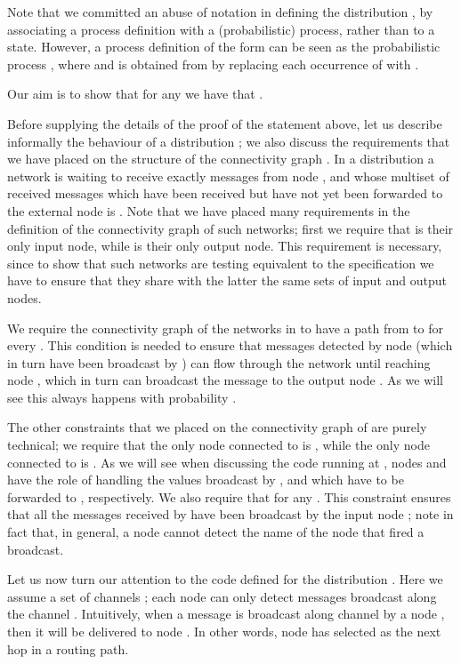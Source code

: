 \documentclass{LMCS}
\begin{document}
\begin{remark}
Note that we committed an abuse of notation in defining the 
distribution , by associating a 
process definition with a (probabilistic) process, rather than to 
a state. However, a process definition of the form  can be seen as the probabilistic 
process , where 
 and  is obtained from  by replacing 
each occurrence of  with .
\end{remark}
\noindent
Our aim is to show that for any  
we have that . 

Before supplying the details of the proof of the statement above, 
let us describe informally the behaviour of a distribution 
; we also discuss the 
requirements that we have placed on the structure of the 
connectivity graph . 
In a distribution  
a network is waiting to receive exactly  messages from node , 
and whose multiset of received messages which have been 
received but have not yet been forwarded to the external node  
is .
Note that we have placed many requirements in the definition of 
the connectivity graph of such networks; first we require that 
 is their only input node, while  is their only output node. 
This requirement is necessary, since to show that such 
networks are testing equivalent to the specification we 
have to ensure that they share with the latter the same sets 
of input and output nodes.

We require the connectivity graph of the networks in  to have 
a path from  to  for every . 
This condition is needed to ensure that messages detected by 
node  (which in turn have been broadcast by ) can flow 
through the network until reaching node , which in turn 
can broadcast the message to the output node . 
As we will see this always happens with probability .

The other constraints that we placed on the connectivity graph 
of  are purely technical; we require that 
the only node connected to  is , while the only node 
connected to  is . As we will see when discussing the 
code running at , nodes  and  
have the role of handling the values broadcast by , and 
which have to be forwarded to , respectively. 
We also require that  
for any . This constraint ensures that all 
the messages received by  have been broadcast by the 
input node ; note in fact that, in general, a node 
cannot detect the name of the node that fired 
a broadcast.

Let us now turn our attention to the code defined for 
the distribution 
. Here we assume a set of 
channels ;   
each node  can only detect messages 
broadcast along the channel . Intuitively, when a 
message is broadcast along channel  by a 
node , then it will be delivered to 
node . In other words, node  has 
selected  as the next hop in a routing path. 
\end{document}
